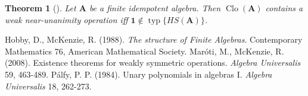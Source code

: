 \documentclass{amsart}
\theoremstyle{plain}
\newtheorem{theorem}{Theorem}[section]
\theoremstyle{definition}
\theoremstyle{remark}
\DeclareMathOperator{\Clo}{Clo}
\DeclareMathOperator{\typ}{typ}
\begin{document}
\begin{theorem}
    [\cite{wnu}]
    Let $\mathbf{A}$ be a finite idempotent algebra. 
    Then $\Clo(\mathbf{A})$ contains a weak near-unanimity operation iff $\mathbf{1} \notin \typ\{HS(\mathbf{A})\}$. 
\end{theorem}

\begin{thebibliography}{9}
    Hobby, D., McKenzie, R. (1988). \emph{The structure of Finite Algebras}. Contemporary Mathematics 76, American Mathematical Society.  
    Mar\'oti, M., McKenzie, R. (2008). Existence theorems for weakly symmetric operations. \emph{Algebra Universalis} 59, 463-489.
    P\'alfy, P. P. (1984). Unary polynomials in algebras I. \emph{Algebra Universalis} 18, 262-273.
 \end{thebibliography}
\end{document}
